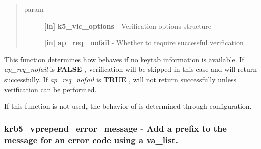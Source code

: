 \documentclass[letterpaper,10pt,english]{sphinxmanual}
\begin{document}
\begin{quote}\begin{description}
\item[{param}] \leavevmode
\textbf{{[}in{]}} \textbf{k5\_vic\_options} - Verification options structure

\textbf{{[}in{]}} \textbf{ap\_req\_nofail} - Whether to require successful verification

\end{description}\end{quote}

This function determines how {\hyperref[appdev/refs/api/krb5_verify_init_creds:c.krb5_verify_init_creds]{}} behaves if no keytab information is available. If \emph{ap\_req\_nofail} is \textbf{FALSE} , verification will be skipped in this case and {\hyperref[appdev/refs/api/krb5_verify_init_creds:c.krb5_verify_init_creds]{}} will return successfully. If \emph{ap\_req\_nofail} is \textbf{TRUE} , {\hyperref[appdev/refs/api/krb5_verify_init_creds:c.krb5_verify_init_creds]{}} will not return successfully unless verification can be performed.

If this function is not used, the behavior of {\hyperref[appdev/refs/api/krb5_verify_init_creds:c.krb5_verify_init_creds]{}} is determined through configuration.


\subsubsection{krb5\_vprepend\_error\_message -  Add a prefix to the message for an error code using a va\_list.}
\label{appdev/refs/api/krb5_vprepend_error_message::doc}\label{appdev/refs/api/krb5_vprepend_error_message:krb5-vprepend-error-message-add-a-prefix-to-the-message-for-an-error-code-using-a-va-list}

\begin{fulllineitems}
\label{appdev/refs/api/krb5_vprepend_error_message:c.krb5_vprepend_error_message}
\end{fulllineitems}
\end{document}
